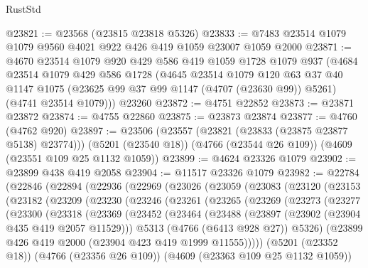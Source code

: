 \begin{lexlean}{RustStd}
\begin{coremodule}
@23821 := @23568 (@23815 @23818 @5326)
@23833 := @7483 @23514 @1079 @1079 @9560 @4021 @922 @426 @419 @1059 @23007 @1059 @2000
@23871 := @4670
    @23514
    @1079
    @920
    @429
    @586
    @419
    @1059
    @1728
    @1079
    @937
    (@4684
      @23514
      @1079
      @429
      @586
      @1728
      (@4645
        @23514
        @1079
        @120
        @63
        @37
        @40
        @1147
        @1075
        (@23625 @99 @37 @99 @1147 (@4707 (@23630 @99)) @5261)
        (@4741 @23514 @1079)))
    @23260
@23872 := @4751 @22852
@23873 := @23871 @23872
@23874 := @4755 @22860
@23875 := @23873 @23874
@23877 := @4760 (@4762 @920)
@23897 := @23506
    (@23557 (@23821 (@23833 (@23875 @23877 @5138) @23774)))
    (@5201 (@23540 @18))
    (@4766 (@23544 @26 @109))
    (@4609 (@23551 @109 @25 @1132 @1059))
@23899 := @4624 @23326 @1079
@23902 := @23899 @438 @419 @2058
@23904 := @11517 @23326 @1079
@23982 := @22784
    (@22846
      (@22894
        (@22936
          (@22969
            (@23026
              (@23059
                (@23083
                  (@23120
                    (@23153
                      (@23182
                        (@23209
                          (@23230
                            (@23246
                              (@23261
                                (@23265
                                  (@23269
                                    (@23273
                                      (@23277
                                        (@23300
                                          (@23318
                                            (@23369
                                              (@23452
                                                (@23464
                                                  (@23488
                                                    (@23897
                                                      (@23902 (@23904 @435 @419 @2057 @11529)))
                                                    @5313
                                                    (@4766 (@6413 @928 @27))
                                                    @5326)
                                                  (@23899
                                                    @426
                                                    @419
                                                    @2000
                                                    (@23904 @423 @419 @1999 @11555)))))
                                            (@5201 (@23352 @18))
                                            (@4766 (@23356 @26 @109))
                                            (@4609 (@23363 @109 @25 @1132 @1059))

\end{coremodule}
\end{lexlean}
